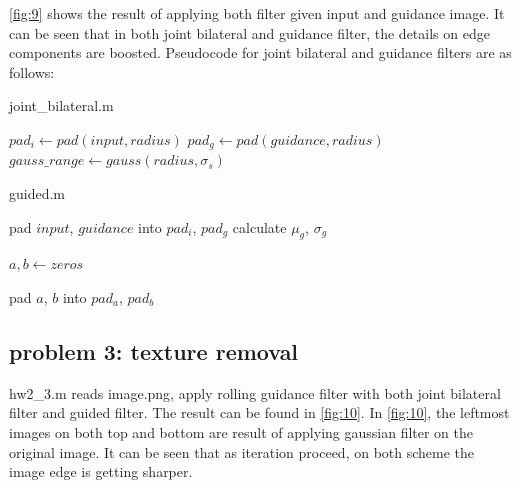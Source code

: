\documentclass[extendedabs]{bmvc2k}
\begin{document}
\figurename{\ref{fig:9}} shows the result of applying both filter given input and guidance image.
It can be seen that in both joint bilateral and guidance filter, the details on edge components
are boosted. Pseudocode for joint bilateral and guidance filters are as follows:

\begin{algorithm}
    \caption{joint\_bilateral.m}
    $pad_{i} \gets pad(input, radius)$\;
    $pad_{g} \gets pad(guidance, radius)$\;
    $gauss\_range \gets gauss(radius, \sigma_s)$\;
    
\end{algorithm}

\begin{algorithm}
    \caption{guided.m}
    pad $input$, $guidance$ into $pad_{i}$, $pad_{g}$\;
    calculate $\mu_{g}$, $\sigma_{g}$\;

    $a, b \gets zeros$\;
    
    pad $a$, $b$ into $pad_{a}$, $pad_{b}$\;
\end{algorithm}

\subsection*{problem 3: texture removal}

hw2\_3.m reads image.png, apply rolling guidance filter with both joint bilateral filter
and guided filter. The result can be found in \figurename{\ref{fig:10}}.
In \figurename{\ref{fig:10}}, the leftmost images on both top and bottom are result of 
applying gaussian filter on the original image. It can be seen that as iteration proceed,
on both scheme the image edge is getting sharper.
\end{document}
